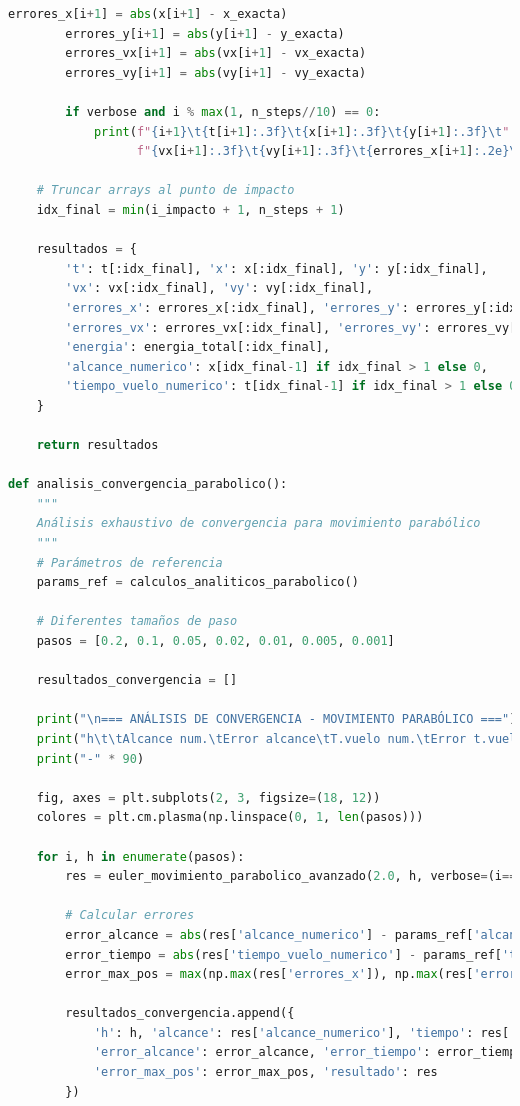 \documentclass{article}
\begin{document}
\begin{lstlisting}[language=Python, caption={Método de Euler para movimiento parabólico con análisis de error}]
        errores_x[i+1] = abs(x[i+1] - x_exacta)
        errores_y[i+1] = abs(y[i+1] - y_exacta)
        errores_vx[i+1] = abs(vx[i+1] - vx_exacta)
        errores_vy[i+1] = abs(vy[i+1] - vy_exacta)
        
        if verbose and i % max(1, n_steps//10) == 0:
            print(f"{i+1}\t{t[i+1]:.3f}\t{x[i+1]:.3f}\t{y[i+1]:.3f}\t"
                  f"{vx[i+1]:.3f}\t{vy[i+1]:.3f}\t{errores_x[i+1]:.2e}\t{errores_y[i+1]:.2e}")
    
    # Truncar arrays al punto de impacto
    idx_final = min(i_impacto + 1, n_steps + 1)
    
    resultados = {
        't': t[:idx_final], 'x': x[:idx_final], 'y': y[:idx_final],
        'vx': vx[:idx_final], 'vy': vy[:idx_final],
        'errores_x': errores_x[:idx_final], 'errores_y': errores_y[:idx_final],
        'errores_vx': errores_vx[:idx_final], 'errores_vy': errores_vy[:idx_final],
        'energia': energia_total[:idx_final],
        'alcance_numerico': x[idx_final-1] if idx_final > 1 else 0,
        'tiempo_vuelo_numerico': t[idx_final-1] if idx_final > 1 else 0
    }
    
    return resultados

def analisis_convergencia_parabolico():
    """
    Análisis exhaustivo de convergencia para movimiento parabólico
    """
    # Parámetros de referencia
    params_ref = calculos_analiticos_parabolico()
    
    # Diferentes tamaños de paso
    pasos = [0.2, 0.1, 0.05, 0.02, 0.01, 0.005, 0.001]
    
    resultados_convergencia = []
    
    print("\n=== ANÁLISIS DE CONVERGENCIA - MOVIMIENTO PARABÓLICO ===")
    print("h\t\tAlcance num.\tError alcance\tT.vuelo num.\tError t.vuelo\tError máx pos.")
    print("-" * 90)
    
    fig, axes = plt.subplots(2, 3, figsize=(18, 12))
    colores = plt.cm.plasma(np.linspace(0, 1, len(pasos)))
    
    for i, h in enumerate(pasos):
        res = euler_movimiento_parabolico_avanzado(2.0, h, verbose=(i==0))
        
        # Calcular errores
        error_alcance = abs(res['alcance_numerico'] - params_ref['alcance'])
        error_tiempo = abs(res['tiempo_vuelo_numerico'] - params_ref['t_vuelo'])
        error_max_pos = max(np.max(res['errores_x']), np.max(res['errores_y']))
        
        resultados_convergencia.append({
            'h': h, 'alcance': res['alcance_numerico'], 'tiempo': res['tiempo_vuelo_numerico'],
            'error_alcance': error_alcance, 'error_tiempo': error_tiempo,
            'error_max_pos': error_max_pos, 'resultado': res
        })
        

\end{lstlisting}
\end{document}

